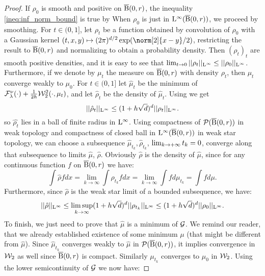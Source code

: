 \begin{proof}
If $\rho_0$ is smooth and positive on $\operatorname{\overline{B}}(0,r)$, the inequality \ref{ineq:inf_norm_bound} is true by \cite[Lemma 5.4.3.]{bonnotte2013unidimensional} When $\rho_0$ is just in $\mathrm{L}^{\infty}(\operatorname{\overline{B}}(0,r))$, we proceed by smoothing. 
For $t \in (0,1]$, let $\rho_t$ be a function obtained by convolution of $\rho_0$ with a Gaussian kernel $(t,x,y) \mapsto (2\pi)^{d/2} \exp(\norm[2]{x-y}/2)$, restricting the result to $\operatorname{\overline{B}}(0,r)$ and normalizing to obtain a probability density. Then $(\rho_t)_{t}$ are smooth positive densities, and it is easy to see that $\lim_{t \rightarrow 0} ||\rho_t||_{\mathrm{L}^{\infty}} \leq ||\rho_0||_{\mathrm{L}^{\infty}}$. Furthermore, if we denote by $\mu_t$ the measure on $\operatorname{\overline{B}}(0,r)$ with density $\rho_t$, then $\mu_t$ converge weakly to $\mu_0$.
For $t \in (0, 1]$ let $\hat{\mu}_t$ be the minimum of $ \mathcal{F}^{\nu}_{\lambda}(\cdot) + \frac{1}{2h} {\cal W}_2^2(\cdot, \mu_t)$, and let $\hat{\rho}_t$ be the density of $\hat{\mu}_t$. Using \cite[Lemma 5.4.3.]{bonnotte2013unidimensional} we get 
\[
||\hat{\rho}_t ||_{\mathrm{L}^{\infty}} \leq (1 + h\sqrt{d})^d ||\rho_t||_{\mathrm{L}^{\infty}}.
\]
so $\hat{\rho_{t}}$ lies in a ball of finite radius in $\mathrm{L}^{\infty}$.  Using compactness of $\mathcal{P}(\operatorname{\overline{B}}(0,r))$ in weak topology and compactness of closed ball in $\mathrm{L}^{\infty}(\operatorname{\overline{B}}(0,r))$ in weak star topology, we can choose a subsequence $\hat{\mu}_{t_k} , \hat{\rho}_{t_k}$, $\lim_{k \to +\infty} t_k =0$, converge along that subsequence to limits $\hat{\mu}$, $\hat{\rho}$. Obviously $\hat{\rho}$ is the density of $\hat{\mu}$, since for any continuous function $f$  on $\operatorname{\overline{B}}(0,r)$ we have:
\[
\int \hat{\rho} f dx = \lim_{k \rightarrow \infty} \int \rho_{t_k} f dx = \lim_{k \rightarrow \infty} \int f d\mu_{t_k} = \int f d\mu.
\]
Furthermore, since $\hat{\rho}$ is the weak star limit of a bounded subsequence, we have:
\[
||\hat{\rho} ||_{\mathrm{L}^{\infty}} \leq \limsup_{k \rightarrow \infty}(1 + h\sqrt{d})^d ||\rho_{t_k}||_{\mathrm{L}^{\infty}} \leq (1 + h\sqrt{d})^d ||\rho_0||_{\mathrm{L}^{\infty}}.
\]
To finish, we just need to prove that $\hat{\mu}$ is a minimum of $\mathcal{G}$. We remind our reader, that we already established existence of some minimum $\mu$ (that might be different from $\hat{\mu}$). Since $\hat{\mu}_{t_k}$ converges weakly to $\hat{\mu}$ in $\mathcal{P}(\operatorname{\overline{B}}(0,r))$, it implies convergence  in ${\cal W}_2$ as well since $\operatorname{\overline{B}}(0,r)$ is compact. Similarly $\mu_{t_k}$ converges to $\mu_0$ in ${\cal W}_2$. Using the lower semicontinuity of $\mathcal{G}$ we now have:

\end{proof}
